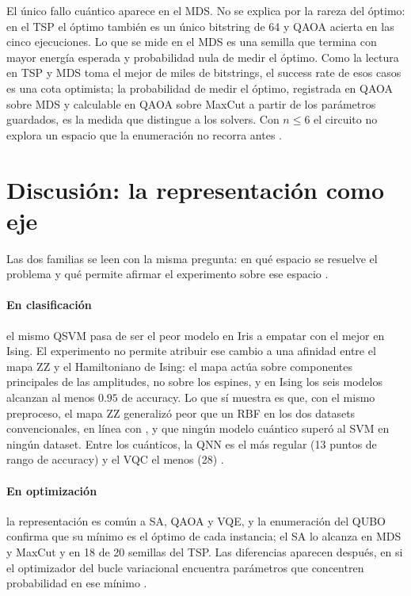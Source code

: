 El único fallo cuántico aparece en el MDS. No se explica por la rareza del óptimo: en el TSP el óptimo también es un único bitstring de 64 y QAOA acierta en las cinco ejecuciones. Lo que se mide en el MDS es una semilla que termina con mayor energía esperada y probabilidad nula de medir el óptimo. Como la lectura en TSP y MDS toma el mejor de miles de bitstrings, el success rate de esos casos es una cota optimista; la probabilidad de medir el óptimo, registrada en QAOA sobre MDS y calculable en QAOA sobre MaxCut a partir de los parámetros guardados, es la medida que distingue a los solvers. Con $n\le 6$ el circuito no explora un espacio que la enumeración no recorra antes \citep{farhi2014, lubinski2024}.

\section{Discusión: la representación como eje}\label{sec:discusion_representacion}

Las dos familias se leen con la misma pregunta: en qué espacio se resuelve el problema y qué permite afirmar el experimento sobre ese espacio \citep{lloyd2020, huang2021, parzygnat2025}.

\paragraph{En clasificación} el mismo QSVM pasa de ser el peor modelo en Iris a empatar con el mejor en Ising. El experimento no permite atribuir ese cambio a una afinidad entre el mapa ZZ y el Hamiltoniano de Ising: el mapa actúa sobre componentes principales de las amplitudes, no sobre los espines, y en Ising los seis modelos alcanzan al menos $0.95$ de accuracy. Lo que sí muestra es que, con el mismo preproceso, el mapa ZZ generalizó peor que un RBF en los dos datasets convencionales, en línea con \citet{huang2021}, y que ningún modelo cuántico superó al SVM en ningún dataset. Entre los cuánticos, la QNN es el más regular (13 puntos de rango de accuracy) y el VQC el menos (28) \citep{bowles2024}.

\paragraph{En optimización} la representación es común a SA, QAOA y VQE, y la enumeración del QUBO confirma que su mínimo es el óptimo de cada instancia; el SA lo alcanza en MDS y MaxCut y en 18 de 20 semillas del TSP. Las diferencias aparecen después, en si el optimizador del bucle variacional encuentra parámetros que concentren probabilidad en ese mínimo \citep{lucas2014, lubinski2024}.

